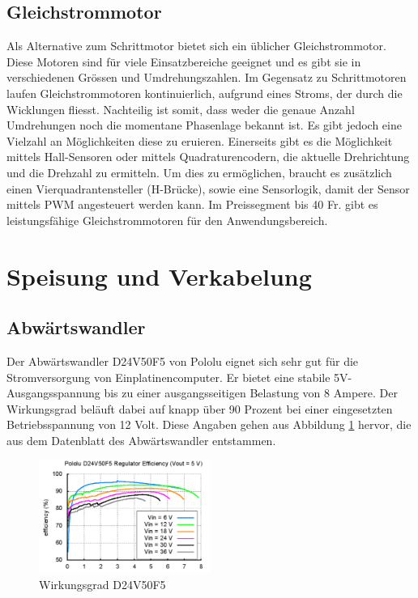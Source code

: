 \subsection{Gleichstrommotor}
Als Alternative zum Schrittmotor bietet sich ein üblicher Gleichstrommotor. Diese Motoren sind für viele Einsatzbereiche geeignet und es gibt sie in verschiedenen Grössen und Umdrehungszahlen. Im Gegensatz zu Schrittmotoren laufen Gleichstrommotoren kontinuierlich, aufgrund eines Stroms, der durch die Wicklungen fliesst. Nachteilig ist somit, dass weder die genaue Anzahl Umdrehungen noch die momentane Phasenlage bekannt ist. Es gibt jedoch eine Vielzahl an Möglichkeiten diese zu eruieren. Einerseits gibt es die Möglichkeit mittels Hall-Sensoren oder mittels Quadraturencodern, die aktuelle Drehrichtung und die Drehzahl zu ermitteln. Um dies zu ermöglichen, braucht es zusätzlich einen Vierquadrantensteller (H-Brücke), sowie eine Sensorlogik, damit der Sensor mittels \ac{PWM} angesteuert werden kann. Im Preissegment bis 40 Fr. gibt es leistungsfähige Gleichstrommotoren für den Anwendungsbereich.


\section{Speisung und Verkabelung}
\label{sec:Speisung und Verkabelung}

\subsection{Abwärtswandler}
\label{sec:Abwaertswandler}
Der Abwärtswandler D24V50F5 von Pololu eignet sich sehr gut für die Stromversorgung von Einplatinencomputer. Er bietet eine stabile 5V-Ausgangsspannung bis zu einer ausgangsseitigen Belastung von 8 Ampere. Der Wirkungsgrad beläuft dabei auf knapp über 90 Prozent bei einer eingesetzten Betriebsspannung von 12 Volt. Diese Angaben gehen aus Abbildung \ref{fig:D24V50F5} hervor, die aus dem Datenblatt des  Abwärtswandler entstammen.

\begin{figure}[H]
	\centering
	\includegraphics[width=0.5\textwidth]
	{resources/D24V50F5.PNG}
	\caption[Wirkungsgrad D24V50F5]{Wirkungsgrad D24V50F5 \protect\cite{D24V50F5}}
	\label{fig:D24V50F5}
\end{figure}

